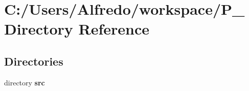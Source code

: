 \section{C\+:/\+Users/\+Alfredo/workspace/\+P\+\_ Directory Reference}
\label{dir_380827211f9ea7a5458cd190fceee5eb}
\subsection*{Directories}
\begin{DoxyCompactItemize}
\item 
directory {\bf src}
\end{DoxyCompactItemize}
